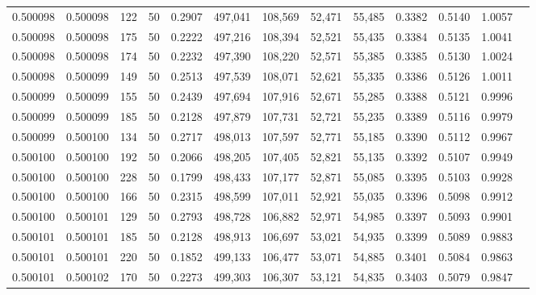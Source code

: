 \begin{tabular}{rrrrrrrrrrrrr}
0.500098 & 0.500098 &   122 &  50 &                                     0.2907 & 497,041 & 108,569 &  52,471 &  55,485 & 0.3382 & 0.5140 & 1.0057 \\
0.500098 & 0.500098 &   175 &  50 &                                     0.2222 & 497,216 & 108,394 &  52,521 &  55,435 & 0.3384 & 0.5135 & 1.0041 \\
0.500098 & 0.500098 &   174 &  50 &                                     0.2232 & 497,390 & 108,220 &  52,571 &  55,385 & 0.3385 & 0.5130 & 1.0024 \\
0.500098 & 0.500099 &   149 &  50 &                                     0.2513 & 497,539 & 108,071 &  52,621 &  55,335 & 0.3386 & 0.5126 & 1.0011 \\
0.500099 & 0.500099 &   155 &  50 &                                     0.2439 & 497,694 & 107,916 &  52,671 &  55,285 & 0.3388 & 0.5121 & 0.9996 \\
0.500099 & 0.500099 &   185 &  50 &                                     0.2128 & 497,879 & 107,731 &  52,721 &  55,235 & 0.3389 & 0.5116 & 0.9979 \\
0.500099 & 0.500100 &   134 &  50 &                                     0.2717 & 498,013 & 107,597 &  52,771 &  55,185 & 0.3390 & 0.5112 & 0.9967 \\
0.500100 & 0.500100 &   192 &  50 &                                     0.2066 & 498,205 & 107,405 &  52,821 &  55,135 & 0.3392 & 0.5107 & 0.9949 \\
0.500100 & 0.500100 &   228 &  50 &                                     0.1799 & 498,433 & 107,177 &  52,871 &  55,085 & 0.3395 & 0.5103 & 0.9928 \\
0.500100 & 0.500100 &   166 &  50 &                                     0.2315 & 498,599 & 107,011 &  52,921 &  55,035 & 0.3396 & 0.5098 & 0.9912 \\
0.500100 & 0.500101 &   129 &  50 &                                     0.2793 & 498,728 & 106,882 &  52,971 &  54,985 & 0.3397 & 0.5093 & 0.9901 \\
0.500101 & 0.500101 &   185 &  50 &                                     0.2128 & 498,913 & 106,697 &  53,021 &  54,935 & 0.3399 & 0.5089 & 0.9883 \\
0.500101 & 0.500101 &   220 &  50 &                                     0.1852 & 499,133 & 106,477 &  53,071 &  54,885 & 0.3401 & 0.5084 & 0.9863 \\
0.500101 & 0.500102 &   170 &  50 &                                     0.2273 & 499,303 & 106,307 &  53,121 &  54,835 & 0.3403 & 0.5079 & 0.9847 \\

\end{tabular}
